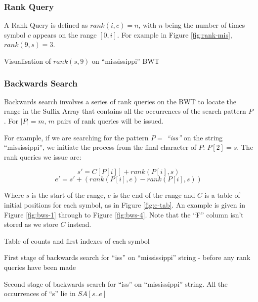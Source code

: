 \subsubsection{Rank Query} %
A Rank Query is defined as $rank(i, c) = n $, with $n$ being the number of
times symbol $c$ appears on the range $[0, i]$. For example in Figure
\ref{fig:rank-mis}, $rank(9, s) = 3$.

			{Visualisation of $rank(s, 9)$ on ``mississippi'' BWT}

\subsubsection{Backwards Search} %
Backwards search involves a series of rank queries on the BWT to locate the
range in the Suffix Array that contains all the occurrences of the search
pattern $P$. For $|P| = m$, $m$ pairs of rank queries will be issued.

For example, if we are searching for the pattern $P = $ \emph{``iss''} on the
string ``mississippi'', we initiate the process from the final character of $P$: 
$P[2] = s$. The rank queries we issue are:

					$$ s' = C[P[i]] + rank(P[i], s)$$
					$$ e' = s' + (rank(P[i], e) - rank(P[i], s))$$

Where $s$ is the start of the range, $e$ is the end of the range and $C$ is a
table of initial positions for each symbol, as in Figure \ref{fig:c-tab}. An
example is given in Figure \ref{fig:bws-1} through to Figure \ref{fig:bws-4}.
Note that the ``F'' column isn't stored as we store $C$ instead.


			{Table of counts and first indexes of each symbol}

			{First stage of backwards search for ``iss'' on ``mississippi''
			 string - before any rank queries have been made}

			{Second stage of backwards search for ``iss'' on ``mississippi'' 
			string. All the occurrences of ``s'' lie in $SA[s..e]$}


